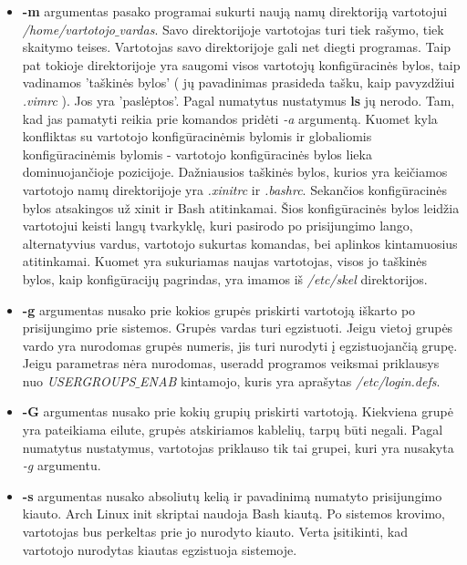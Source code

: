   \begin{itemize}
    \item \textbf{-m} argumentas pasako programai sukurti naują namų
      direktoriją vartotojui \textsl{/home/vartotojo$\_$vardas}. Savo
      direktorijoje vartotojas turi tiek rašymo, tiek skaitymo
      teises. Vartotojas savo direktorijoje gali net diegti
      programas. Taip pat tokioje direktorijoje yra saugomi visos
      vartotojų konfigūracinės bylos, taip vadinamos 'taškinės bylos' (
      jų pavadinimas prasideda tašku, kaip pavyzdžiui \textsl{.vimrc}
      ). Jos yra 'paslėptos'. Pagal numatytus nustatymus \textbf{ls}
      jų nerodo. Tam, kad jas pamatyti reikia prie komandos pridėti
      \textsl{-a} argumentą. Kuomet kyla konfliktas su vartotojo
      konfigūracinėmis bylomis ir globaliomis konfigūracinėmis bylomis
      - vartotojo konfigūracinės bylos lieka dominuojančioje
      pozicijoje. Dažniausios taškinės bylos, kurios yra keičiamos
      vartotojo namų direktorijoje yra \textsl{.xinitrc} ir
      \textsl{.bashrc}. Sekančios konfigūracinės bylos atsakingos už
      xinit ir Bash atitinkamai. Šios konfigūracinės bylos leidžia
      vartotojui keisti langų tvarkyklę, kuri pasirodo po prisijungimo
      lango, alternatyvius vardus, vartotojo sukurtas komandas, bei
      aplinkos kintamuosius atitinkamai. Kuomet yra sukuriamas naujas
      vartotojas, visos jo taškinės bylos, kaip konfigūracijų
      pagrindas, yra imamos iš \textsl{/etc/skel} direktorijos. 
    \item \textbf{-g} argumentas nusako prie kokios grupės priskirti
      vartotoją iškarto po prisijungimo prie sistemos. Grupės vardas
      turi egzistuoti. Jeigu vietoj grupės vardo yra nurodomas grupės
      numeris, jis turi nurodyti į egzistuojančią grupę. Jeigu
      parametras nėra nurodomas, useradd programos veiksmai priklausys
      nuo \textsl{USERGROUPS$\_$ENAB} kintamojo, kuris yra aprašytas
      \textsl{/etc/login.defs}.
    \item \textbf{-G} argumentas nusako prie kokių grupių priskirti
      vartotoją. Kiekviena grupė yra pateikiama eilute, grupės
      atskiriamos kablelių, tarpų būti negali. Pagal numatytus
      nustatymus, vartotojas priklauso tik tai grupei, kuri yra
      nusakyta \textsl{-g} argumentu.
    \item \textbf{-s} argumentas nusako absoliutų kelią ir pavadinimą
      numatyto prisijungimo kiauto. Arch Linux init skriptai naudoja
      Bash kiautą. Po sistemos krovimo, vartotojas bus perkeltas prie
      jo nurodyto kiauto. Verta įsitikinti, kad vartotojo nurodytas
      kiautas egzistuoja sistemoje.
  \end{itemize}

